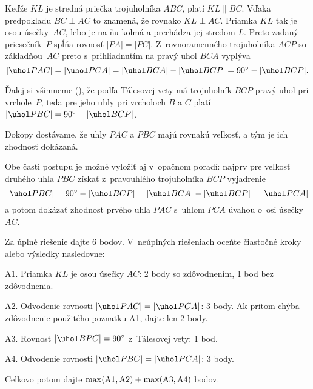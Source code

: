 {%
Keďže $KL$ je stredná priečka trojuholníka $ABC$, platí
$KL\parallel BC$. Vďaka predpokladu $BC\perp AC$ to znamená, že
rovnako $KL\perp AC$. Priamka $KL$ tak je osou úsečky~$AC$, lebo je na ňu
kolmá a prechádza jej stredom $L$. Preto zadaný priesečník~$P$
spĺňa rovnosť $|PA|=|PC|$. Z~rovnoramenného trojuholníka $ACP$
so základňou~$AC$ preto s~prihliadnutím na pravý uhol $BCA$ vyplýva
$$
|\uhol PAC|=|\uhol PCA|=|\uhol BCA|-|\uhol BCP| =90^{\circ}-|\uhol BCP|.
$$

Ďalej si všimneme (\obr), že podľa Tálesovej vety má trojuholník $BCP$
pravý uhol pri vrchole~$P$, teda pre jeho uhly
pri vrcholoch $B$ a $C$ platí $|\uhol PBC|=90^{\circ}-|\uhol BCP|$.

Dokopy dostávame, že uhly $PAC$ a $PBC$ majú rovnakú veľkosť,
a tým je ich zhodnosť dokázaná.
%

\poznamka
Obe časti postupu je možné vyložiť aj v~opačnom poradí:
najprv pre veľkosť druhého uhla $PBC$ získať
z~pravouhlého trojuholníka $BCP$ vyjadrenie
$$
|\uhol PBC|=90^{\circ}-|\uhol BCP|=|\uhol BCA|-|\uhol BCP|=|\uhol PCA|
$$
a potom dokázať zhodnosť prvého uhla $PAC$ s~uhlom $PCA$ úvahou
o~osi úsečky~$AC$.


\schemaABC
Za úplné riešenie dajte 6 bodov. V~neúplných
riešeniach oceňte čiastočné kroky alebo výsledky nasledovne:
\item{A1.} Priamka $KL$ je osou úsečky $AC$: 2 body so zdôvodnením, 1 bod bez zdôvodnenia.
\item{A2.} Odvodenie rovnosti $|\uhol PAC|=|\uhol PCA|$: 3 body. Ak pritom chýba zdôvodnenie použitého poznatku A1, dajte len 2 body.
\item{A3.} Rovnosť $|\uhol BPC|=90^{\circ}$ z~Tálesovej vety: 1 bod.
\item{A4.} Odvodenie rovnosti $|\uhol PBC|=|\uhol PCA|$: 3 body.

\noindent
Celkovo potom dajte $\rm\max(A1,A2)+\max(A3,A4)$ bodov.
\endschema
}

